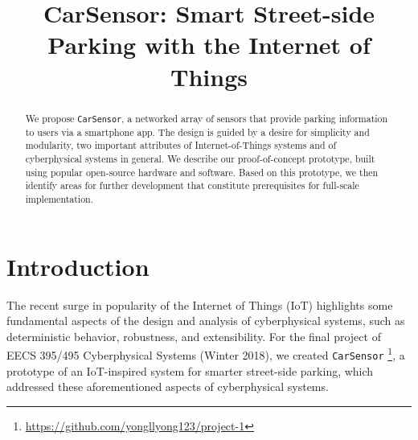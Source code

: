 \documentclass[conference]{IEEEtran}
\begin{document}


\title{CarSensor: Smart Street-side Parking with the Internet of Things}

\author{
	\and
	}
	
\maketitle

\begin{abstract}
We propose \texttt{CarSensor}, a networked array of sensors that provide parking information to users via a smartphone app. The design is guided by a desire for simplicity and modularity, two important attributes of Internet-of-Things systems and of cyberphysical systems in general. We describe our proof-of-concept prototype, built using popular open-source hardware and software. Based on this prototype, we then identify areas for further development that constitute prerequisites for full-scale implementation.
\end{abstract}

\section{Introduction}\label{sec_intro}
The recent surge in popularity of the Internet of Things (IoT) highlights some fundamental aspects of the design and analysis of cyberphysical systems, such as deterministic behavior, robustness, and extensibility. For the final project of EECS 395/495 Cyberphysical Systems (Winter 2018), we created \texttt{CarSensor} \footnote{\url{https://github.com/yongllyong123/project-1}}, a prototype of an IoT-inspired system for smarter street-side parking, which addressed these aforementioned aspects of cyberphysical systems.
\end{document}
